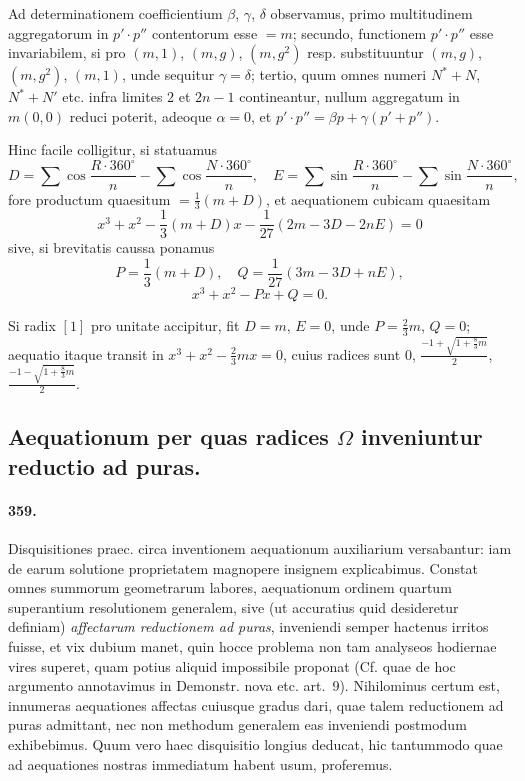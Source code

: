 \documentclass[12pt,a4paper]{article}
\theoremstyle{plain}
\theoremstyle{definition}
\theoremstyle{remark}
\begin{document}
Ad determinationem coefficientium $\beta$, $\gamma$, $\delta$ observamus, primo
multitudinem aggregatorum in $p' \cdot p''$ contentorum esse $= m$; secundo,
functionem $p' \cdot p''$ esse invariabilem, si pro $(m,1)$, $(m,g)$, $(m,g^2)$
resp. substituuntur $(m,g)$, $(m,g^2)$, $(m,1)$, unde sequitur
$\gamma = \delta$; tertio, quum omnes numeri $N^*+N$, $N^*+N'$ etc. infra
limites $2$ et $2n-1$ contineantur, nullum aggregatum in $m(0,0)$ reduci
poterit, adeoque $\alpha = 0$, et $p' \cdot p'' = \beta p + \gamma(p'+p'')$.

Hinc facile colligitur, si statuamus
\[
D = \sum\cos\frac{R\cdot 360^\circ}{n} - \sum\cos\frac{N\cdot 360^\circ}{n},
\quad
E = \sum\sin\frac{R\cdot 360^\circ}{n} - \sum\sin\frac{N\cdot 360^\circ}{n},
\]
fore productum quaesitum $= \frac{1}{3}(m + D)$, et aequationem cubicam quaesitam
\[
x^3 + x^2 - \frac{1}{3}(m+D)x - \frac{1}{27}(2m-3D-2nE) = 0
\]
sive, si brevitatis caussa ponamus
\[
P = \frac{1}{3}(m+D), \quad Q = \frac{1}{27}(3m-3D+nE),
\]
\[
x^3 + x^2 - Px + Q = 0.
\]

Si radix $[1]$ pro unitate accipitur, fit $D = m$, $E = 0$, unde
$P = \frac{2}{3}m$, $Q = 0$; aequatio itaque transit in $x^3 + x^2 - \frac{2}{3}mx = 0$,
cuius radices sunt $0$, $\frac{-1+\sqrt{1+\frac{8}{3}m}}{2}$,
$\frac{-1-\sqrt{1+\frac{8}{3}m}}{2}$.


\subsection*{Aequationum per quas radices $\Omega$ inveniuntur reductio ad puras.}

\paragraph{359.}
Disquisitiones praec. circa inventionem aequationum auxiliarium versabantur:
iam de earum solutione proprietatem magnopere insignem explicabimus. Constat omnes summorum geometrarum labores, aequationum ordinem quartum superantium
resolutionem generalem, sive (ut accuratius quid desideretur definiam)
\emph{affectarum reductionem ad puras}, inveniendi semper hactenus irritos
fuisse, et vix dubium manet, quin hocce problema non tam analyseos hodiernae
vires superet, quam potius aliquid impossibile proponat (Cf. quae de hoc
argumento annotavimus in Demonstr. nova etc. art.~9). Nihilominus certum est,
innumeras aequationes affectas cuiusque gradus dari, quae talem reductionem
ad puras admittant, nec non methodum generalem eas inveniendi postmodum
exhibebimus. Quum vero haec disquisitio longius deducat, hic tantummodo
quae ad aequationes nostras immediatum habent usum, proferemus.
\end{document}
